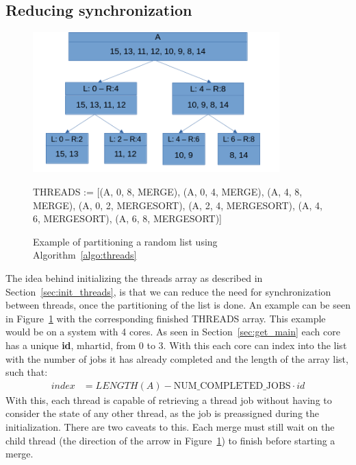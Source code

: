 \subsection{Reducing synchronization}
\begin{figure}
  \begin{center}
    \includegraphics[width=0.85\textwidth]{figures/mergesort.png}
  \end{center}
  THREADS := [(A, 0, 8, MERGE), (A, 0, 4, MERGE), (A, 4, 8, MERGE), (A, 0, 2, MERGESORT),
  (A, 2, 4, MERGESORT), (A, 4, 6, MERGESORT), (A, 6, 8, MERGESORT)]
  \caption{Example of partitioning a random list using Algorithm~\ref{algo:threads}}\label{fig:mergesort}
\end{figure}

The idea behind initializing the threads array as described in
Section~\ref{sec:init_threads}, is  that we can reduce the need for
synchronization between threads, once the partitioning of the list is done. An
example can be seen in Figure~\ref{fig:mergesort} with the corresponding
finished THREADS array. This example would be on a system with 4 cores. As seen
in Section~\ref{sec:get_main} each core has a unique \textbf{id}, mhartid, from 0 to 3.
With this each core can index into the list with the number of jobs it has
already completed and the length of the array list, such that:
\begin{align}
  index &= LENGTH(A) - \text{NUM\_COMPLETED\_JOBS}\cdot id
\end{align}
With this, each thread is capable of retrieving a thread job without having to
consider the state of any other thread, as the job is preassigned during the
initialization. There are two caveats to this. Each merge must still wait on the
child thread (the direction of the arrow in Figure~\ref{fig:mergesort}) to
finish before starting a merge.



